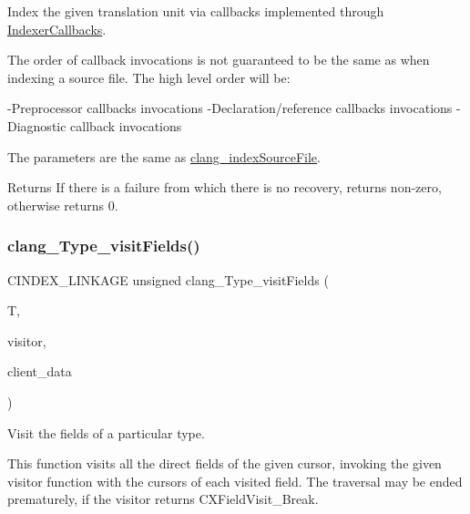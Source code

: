 Index the given translation unit via callbacks implemented through \mbox{\hyperlink{structIndexerCallbacks}{Indexer\+Callbacks}}. 

The order of callback invocations is not guaranteed to be the same as when indexing a source file. The high level order will be\+:

-\/\+Preprocessor callbacks invocations -\/\+Declaration/reference callbacks invocations -\/\+Diagnostic callback invocations

The parameters are the same as \mbox{\hyperlink{group__CINDEX__HIGH_gaa5c2ad8979779c401b91110d444e2be6}{clang\+\_\+index\+Source\+File}}.

\begin{DoxyReturn}{Returns}
If there is a failure from which there is no recovery, returns non-\/zero, otherwise returns 0. 
\end{DoxyReturn}
\mbox{\label{group__CINDEX__HIGH_ga18285a2cefecf5a069c64e675b627273}} 
\subsubsection{\texorpdfstring{clang\+\_\+\+Type\+\_\+visit\+Fields()}{clang\_Type\_visitFields()}}
{\footnotesize\ttfamily C\+I\+N\+D\+E\+X\+\_\+\+L\+I\+N\+K\+A\+GE unsigned clang\+\_\+\+Type\+\_\+visit\+Fields (\begin{DoxyParamCaption}\item[{\mbox{\hyperlink{structCXType}{C\+X\+Type}}}]{T,  }\item[{\mbox{\hyperlink{group__CINDEX__HIGH_ga5040863c91d7a720a97569cf869f42a4}{C\+X\+Field\+Visitor}}}]{visitor,  }\item[{\mbox{\hyperlink{group__CINDEX_gacfa40c3de26d228c0d898403c2c21612}{C\+X\+Client\+Data}}}]{client\+\_\+data }\end{DoxyParamCaption})}



Visit the fields of a particular type. 

This function visits all the direct fields of the given cursor, invoking the given {\ttfamily visitor} function with the cursors of each visited field. The traversal may be ended prematurely, if the visitor returns {\ttfamily C\+X\+Field\+Visit\+\_\+\+Break}.


